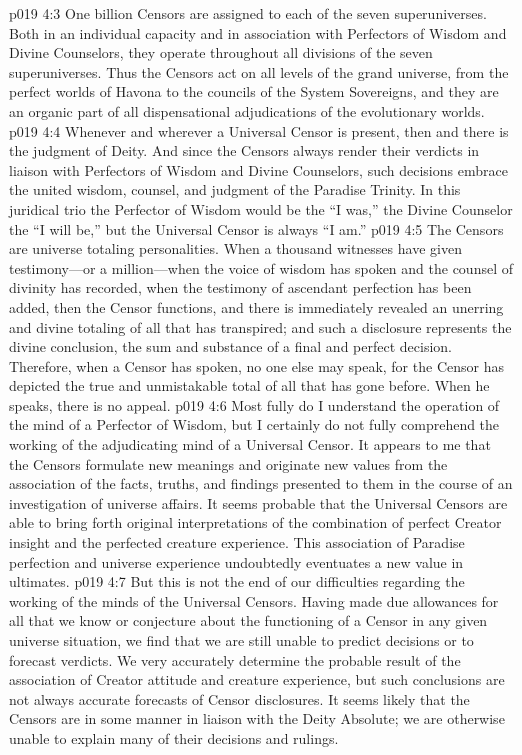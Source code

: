 \vs p019 4:3 One billion Censors are assigned to each of the seven superuniverses. Both in an individual capacity and in association with Perfectors of Wisdom and Divine Counselors, they operate throughout all divisions of the seven superuniverses. Thus the Censors act on all levels of the grand universe, from the perfect worlds of Havona to the councils of the System Sovereigns, and they are an organic part of all dispensational adjudications of the evolutionary worlds.
\pc \vs p019 4:4 Whenever and wherever a Universal Censor is present, then and there is the judgment of Deity. And since the Censors always render their verdicts in liaison with Perfectors of Wisdom and Divine Counselors, such decisions embrace the united wisdom, counsel, and judgment of the Paradise Trinity. In this juridical trio the Perfector of Wisdom would be the “I was,” the Divine Counselor the “I will be,” but the Universal Censor is always “I am.”
\pc \vs p019 4:5 The Censors are universe totaling personalities. When a thousand witnesses have given testimony---or a million---when the voice of wisdom has spoken and the counsel of divinity has recorded, when the testimony of ascendant perfection has been added, then the Censor functions, and there is immediately revealed an unerring and divine totaling of all that has transpired; and such a disclosure represents the divine conclusion, the sum and substance of a final and perfect decision. Therefore, when a Censor has spoken, no one else may speak, for the Censor has depicted the true and unmistakable total of all that has gone before. When he speaks, there is no appeal.
\vs p019 4:6 Most fully do I understand the operation of the mind of a Perfector of Wisdom, but I certainly do not fully comprehend the working of the adjudicating mind of a Universal Censor. It appears to me that the Censors formulate new meanings and originate new values from the association of the facts, truths, and findings presented to them in the course of an investigation of universe affairs. It seems probable that the Universal Censors are able to bring forth original interpretations of the combination of perfect Creator insight and the perfected creature experience. This association of Paradise perfection and universe experience undoubtedly eventuates a new value in ultimates.
\vs p019 4:7 But this is not the end of our difficulties regarding the working of the minds of the Universal Censors. Having made due allowances for all that we know or conjecture about the functioning of a Censor in any given universe situation, we find that we are still unable to predict decisions or to forecast verdicts. We very accurately determine the probable result of the association of Creator attitude and creature experience, but such conclusions are not always accurate forecasts of Censor disclosures. It seems likely that the Censors are in some manner in liaison with the Deity Absolute; we are otherwise unable to explain many of their decisions and rulings.
